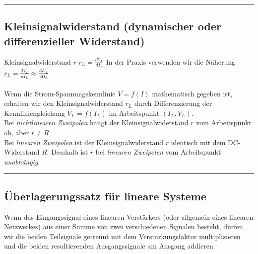 \hrule
		
		\subsection{Kleinsignalwiderstand (dynamischer oder differenzieller
		Widerstand) }
			Kleinsignalwiderstand $r$ \hspace{15mm} $r_L=\frac{dV_L}{dI_L}$ In der Praxis
			verwenden wir die Näherung $r_L=\frac{dV_L}{dI_L}\approx \frac{\Delta
			V_L}{\Delta I_L}$\\ \\
			Wenn die Strom-Spannungskennlinie $V=f(I)$ mathematisch gegeben ist, erhalten
			wir den Kleinsignalwiderstand $r_L$ durch Differenzierung der
			Kennliniengleichung $V_L=f(I_L)$ im Arbeitspunkt $(I_L, V_L)$.\\
			Bei {\it nichtlinearen Zweipolen} hängt der Kleinsignalwiderstand $r$
			vom Arbeitspunkt ab, aber $r\neq R$\\
			Bei {\it linearen Zweipolen} ist der Kleinsignalwiderstand $r$
			identisch mit dem DC-Widerstand $R$. Desshalb ist $r$ bei {\it linearen
			Zweipolen} vom Arbeitspunkt {\it unabhängig}.\\
		
\hrule
		
		\subsection{Überlagerungssatz für lineare Systeme }
			Wenn das Eingangssignal eines linearen Verstärkers (oder allgemein eines
			linearen Netzwerkes) aus einer Summe von zwei verschiedenen Signalen besteht,
			dürfen wir die beiden Teilsignale getrennt mit dem Verstärkungsfaktor
			multiplizieren und die beiden resultierenden Ausgangssignale am Ausgang
			addieren.\\
			\hspace*{10mm}
			\\